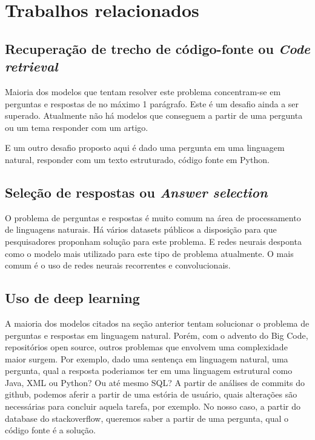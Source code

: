 \chapter{Trabalhos relacionados}
\label{cap:trabalhos-relacionados}



\section{Recuperação de trecho de código-fonte ou \textit{Code retrieval}}
\label{sec:code-retrieval}

Maioria dos modelos que tentam resolver este problema concentram-se em perguntas e respostas de no máximo 1 parágrafo. Este é um desafio ainda a ser superado. Atualmente não há modelos que conseguem a partir de uma pergunta ou um tema responder com um artigo. 


E um outro desafio proposto aqui é dado uma pergunta em uma linguagem natural, responder com um texto estruturado, código fonte em Python.

\section{Seleção de respostas ou \textit{Answer selection}}
\label{sec:answer-selection}

O problema de perguntas e respostas é muito comum na área de processamento de linguagens naturais. Há vários datasets públicos a disposição para que pesquisadores proponham solução para este problema. E redes neurais desponta como o modelo mais utilizado para este tipo de problema atualmente. O mais comum é o uso de redes neurais recorrentes e convolucionais. 


\section{Uso de deep learning}
\label{sec:uso-deep-learning}

A maioria dos modelos citados na seção anterior tentam solucionar o problema de perguntas e respostas em linguagem natural. Porém, com o advento do Big Code, repositórios open source, outros problemas que envolvem uma complexidade maior surgem. Por exemplo, dado uma sentença em linguagem natural, uma pergunta, qual a resposta poderiamos ter em uma linguagem estrutural como Java, XML ou Python? Ou até mesmo SQL? A partir de análises de commits do github, podemos aferir a partir de uma estória de usuário, quais alterações são necessárias para concluir aquela tarefa, por exemplo. No nosso caso, a partir do database do stackoverflow, queremos saber a partir de uma pergunta, qual o código fonte é a solução.
